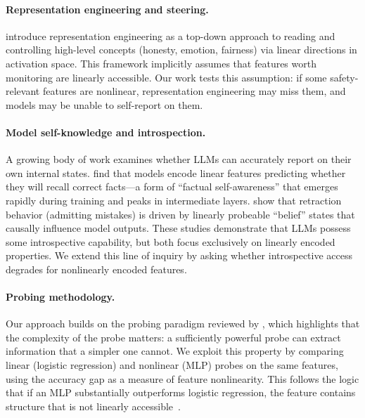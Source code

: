 \paragraph{Representation engineering and steering.}
\citet{zou2023representation} introduce representation engineering as a top-down approach to reading and controlling high-level concepts (honesty, emotion, fairness) via linear directions in activation space. This framework implicitly assumes that features worth monitoring are linearly accessible. Our work tests this assumption: if some safety-relevant features are nonlinear, representation engineering may miss them, and models may be unable to self-report on them.

\paragraph{Model self-knowledge and introspection.}
A growing body of work examines whether LLMs can accurately report on their own internal states. \citet{tamoyan2025factual} find that models encode linear features predicting whether they will recall correct facts---a form of ``factual self-awareness'' that emerges rapidly during training and peaks in intermediate layers. \citet{yang2025when} show that retraction behavior (admitting mistakes) is driven by linearly probeable ``belief'' states that causally influence model outputs. These studies demonstrate that LLMs possess some introspective capability, but both focus exclusively on linearly encoded properties. We extend this line of inquiry by asking whether introspective access degrades for nonlinearly encoded features.

\paragraph{Probing methodology.}
Our approach builds on the probing paradigm reviewed by \citet{belinkov2021probing}, which highlights that the complexity of the probe matters: a sufficiently powerful probe can extract information that a simpler one cannot. We exploit this property by comparing linear (logistic regression) and nonlinear (MLP) probes on the same features, using the accuracy gap as a measure of feature nonlinearity. This follows the logic that if an MLP substantially outperforms logistic regression, the feature contains structure that is not linearly accessible~\cite{belinkov2021probing}.

